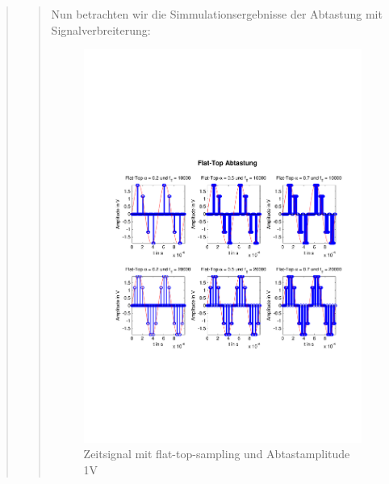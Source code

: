 \begin{quote}
\begin{quote}
  	    Nun betrachten wir die Simmulationsergebnisse der Abtastung mit
  	    Signalverbreiterung:
  	    
  	    \begin{figure}[H]
    \centering
        \includegraphics[scale=0.7, trim = 0cm 0cm 0cm 0cm,
        clip]{./Bilder/flat-top-zeit_1V}
            \caption{Zeitsignal mit flat-top-sampling und Abtastamplitude 1V}
  	    \end{figure}
  	    

\end{quote}
\end{quote}

